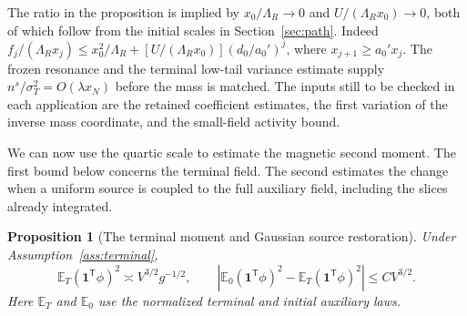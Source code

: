 \documentclass[11pt]{article}
\newtheorem{proposition}[theorem]{Proposition}
\theoremstyle{definition}
\newcommand{\one}{\mathbf 1}
\newcommand{\E}{\mathbb E}
\begin{document}
The ratio in the proposition is implied by
\(x_0/\Lambda_R\to0\) and \(U/(\Lambda_R x_0)\to0\), both of which
follow from the initial scales in Section~\ref{sec:path}. Indeed
\(f_j/(\Lambda_R x_j)\le x_0^2/\Lambda_R+
[U/(\Lambda_R x_0)](d_0/a_0')^j\), where
\(x_{j+1}\ge a_0'x_j\). The frozen resonance and the
terminal low-tail variance estimate supply
\(n^s/\sigma_T^2=O(\lambda x_N)\) before the mass is matched.
The inputs still to be checked in each application are the retained
coefficient estimates, the first variation of the inverse mass
coordinate, and the small-field activity bound.

We can now use the quartic scale to estimate the magnetic second
moment. The first bound below concerns the terminal field. The
second estimates the change when a uniform source is coupled to
the full auxiliary field, including the slices already integrated.

\begin{proposition}[The terminal moment and Gaussian source restoration]
\label{prop:terminal}
Under Assumption~\ref{ass:terminal},
\begin{equation}
 \E_T(\one^{\mathsf T}\phi)^2\asymp V^{3/2}g^{-1/2},\qquad
 |\E_0(\one^{\mathsf T}\phi)^2-\E_T(\one^{\mathsf T}\phi)^2|
 \le C V^{3/2}.
\end{equation}
Here \(\E_T\) and \(\E_0\) use the normalized terminal and
initial auxiliary laws.
\end{proposition}
\end{document}
